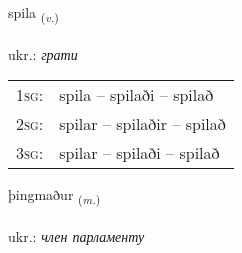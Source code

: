 \documentclass[frontgrid, backgrid]{flacards}\usepackage[]{graphicx}\usepackage[]{xcolor}
\begin{document}
\renewcommand{\flhead}{\vskip5pt \fboxsep=0pt {\small\bfseries\footnotesize Sagnorð | дієслово}}
\renewcommand{\fcfoot}{\vskip5pt \fboxsep=0pt \hspace{2pt}{\small\bfseries\footnotesize 1K}}

\renewcommand{\blhead}{\vskip5pt {\small\bfseries\footnotesize Sagnorð | дієслово }}
\renewcommand{\bcfoot}{\vskip5pt \hspace{2pt}{\small\bfseries\footnotesize 1K}}


{spila \small{\textsubscript{(\textit{v.})}} \\[1ex] %
\textphonetic{[spɪːla]} \\
ukr.: \emph{грати} \\  [2ex]
\renewcommand*{\arraystretch}{0.8}
\begin{tabular}{p{1cm}l}
\textsc{1sg}: & spila -- spilaði -- spilað \\ 
\textsc{2sg}: & spilar -- spilaðir -- spilað \\ 
\textsc{3sg}: & spilar -- spilaði -- spilað \\ 
\end{tabular}
}

\renewcommand{\flhead}{\vskip5pt \fboxsep=0pt {\small\bfseries\footnotesize Nafnorð | іменник}}
\renewcommand{\fcfoot}{\vskip5pt \fboxsep=0pt \hspace{2pt}{\small\bfseries\footnotesize 1K}}

\renewcommand{\blhead}{\vskip5pt {\small\bfseries\footnotesize Nafnorð | іменник }}
\renewcommand{\bcfoot}{\vskip5pt \hspace{2pt}{\small\bfseries\footnotesize 1K}}


{þingmaður \small{\textsubscript{(\textit{m.})}} \\[1ex] %
\textphonetic{[θiŋkmaðʏr]} \\
ukr.: \emph{член парламенту} \\  [2ex]
\renewcommand*{\arraystretch}{0.8}
}
\end{document}

